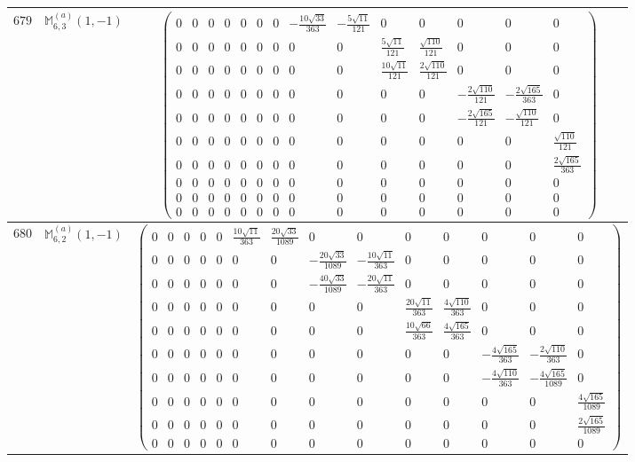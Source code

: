 \documentclass[fleqn,8pt,landscape]{jsarticle}
\begin{document}
\begin{center}
\begin{longtable}{ccc}
$ 679 $ & $ \mathbb{M}_{6,3}^{(a)}(1,-1) $ & $ \begin{pmatrix} 0 & 0 & 0 & 0 & 0 & 0 & 0 & - \frac{10 \sqrt{33}}{363} & - \frac{5 \sqrt{11}}{121} & 0 & 0 & 0 & 0 & 0 \\ 0 & 0 & 0 & 0 & 0 & 0 & 0 & 0 & 0 & \frac{5 \sqrt{11}}{121} & \frac{\sqrt{110}}{121} & 0 & 0 & 0 \\ 0 & 0 & 0 & 0 & 0 & 0 & 0 & 0 & 0 & \frac{10 \sqrt{11}}{121} & \frac{2 \sqrt{110}}{121} & 0 & 0 & 0 \\ 0 & 0 & 0 & 0 & 0 & 0 & 0 & 0 & 0 & 0 & 0 & - \frac{2 \sqrt{110}}{121} & - \frac{2 \sqrt{165}}{363} & 0 \\ 0 & 0 & 0 & 0 & 0 & 0 & 0 & 0 & 0 & 0 & 0 & - \frac{2 \sqrt{165}}{121} & - \frac{\sqrt{110}}{121} & 0 \\ 0 & 0 & 0 & 0 & 0 & 0 & 0 & 0 & 0 & 0 & 0 & 0 & 0 & \frac{\sqrt{110}}{121} \\ 0 & 0 & 0 & 0 & 0 & 0 & 0 & 0 & 0 & 0 & 0 & 0 & 0 & \frac{2 \sqrt{165}}{363} \\ 0 & 0 & 0 & 0 & 0 & 0 & 0 & 0 & 0 & 0 & 0 & 0 & 0 & 0 \\ 0 & 0 & 0 & 0 & 0 & 0 & 0 & 0 & 0 & 0 & 0 & 0 & 0 & 0 \\ 0 & 0 & 0 & 0 & 0 & 0 & 0 & 0 & 0 & 0 & 0 & 0 & 0 & 0 \end{pmatrix} $ \\ \hline
$ 680 $ & $ \mathbb{M}_{6,2}^{(a)}(1,-1) $ & $ \begin{pmatrix} 0 & 0 & 0 & 0 & 0 & \frac{10 \sqrt{11}}{363} & \frac{20 \sqrt{33}}{1089} & 0 & 0 & 0 & 0 & 0 & 0 & 0 \\ 0 & 0 & 0 & 0 & 0 & 0 & 0 & - \frac{20 \sqrt{33}}{1089} & - \frac{10 \sqrt{11}}{363} & 0 & 0 & 0 & 0 & 0 \\ 0 & 0 & 0 & 0 & 0 & 0 & 0 & - \frac{40 \sqrt{33}}{1089} & - \frac{20 \sqrt{11}}{363} & 0 & 0 & 0 & 0 & 0 \\ 0 & 0 & 0 & 0 & 0 & 0 & 0 & 0 & 0 & \frac{20 \sqrt{11}}{363} & \frac{4 \sqrt{110}}{363} & 0 & 0 & 0 \\ 0 & 0 & 0 & 0 & 0 & 0 & 0 & 0 & 0 & \frac{10 \sqrt{66}}{363} & \frac{4 \sqrt{165}}{363} & 0 & 0 & 0 \\ 0 & 0 & 0 & 0 & 0 & 0 & 0 & 0 & 0 & 0 & 0 & - \frac{4 \sqrt{165}}{363} & - \frac{2 \sqrt{110}}{363} & 0 \\ 0 & 0 & 0 & 0 & 0 & 0 & 0 & 0 & 0 & 0 & 0 & - \frac{4 \sqrt{110}}{363} & - \frac{4 \sqrt{165}}{1089} & 0 \\ 0 & 0 & 0 & 0 & 0 & 0 & 0 & 0 & 0 & 0 & 0 & 0 & 0 & \frac{4 \sqrt{165}}{1089} \\ 0 & 0 & 0 & 0 & 0 & 0 & 0 & 0 & 0 & 0 & 0 & 0 & 0 & \frac{2 \sqrt{165}}{1089} \\ 0 & 0 & 0 & 0 & 0 & 0 & 0 & 0 & 0 & 0 & 0 & 0 & 0 & 0 \end{pmatrix} $ \\ \hline

\end{longtable}
\end{center}
\end{document}
